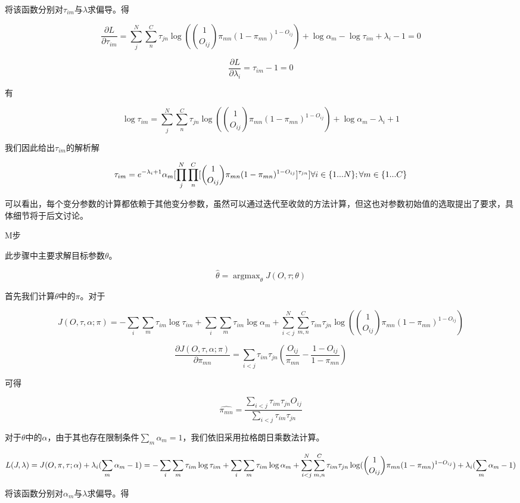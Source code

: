 \documentclass[
]{article}
\begin{document}
将该函数分别对\(\tau_{im}\)与\(\lambda\)求偏导。得

\[\frac{\partial L}{\partial \tau_{im}}=\sum_{j}^N\sum_{n}^C\tau_{jn}\log ( \binom{1}{O_{ij}}\pi_{mn}(1-\pi_{mn})^{1-O_{ij}})+\log \alpha_m -\log \tau_{im} +\lambda_i-1=0\]

\[\frac{\partial L}{\partial \lambda_i}=\tau_{im}-1=0\]

有

\[\log \tau_{im} =\sum_{j}^N\sum_{n}^C\tau_{jn}\log ( \binom{1}{O_{ij}}\pi_{mn}(1-\pi_{mn})^{1-O_{ij}})+\log \alpha_m -\lambda_i+1\]

我们因此给出\(\tau_{im}\)的解析解

\[\tau_{im} = e^{-\lambda_i+1}\alpha_m[\prod_j^N\prod_n^C[ \binom{1}{O_{ij}}\pi_{mn}(1-\pi_{mn})^{1-O_{ij}}]^{\tau_{jn}}]\\
\forall i \in \{1 ...N\} ;\forall m \in \{1 ... C\}\]

可以看出，每个变分参数的计算都依赖于其他变分参数，虽然可以通过迭代至收敛的方法计算，但这也对参数初始值的选取提出了要求，具体细节将于后文讨论。

M步

此步骤中主要求解目标参数\(\theta\)。

\[\hat{\theta}=\mathop{\arg\max}_\theta J(O,\tau;\theta)\]

首先我们计算\(\theta\)中的\(\pi\)。对于

\[J(O,\tau,\alpha;\pi)=-\sum_i\sum_m\tau_{im} \log \tau_{im} +\sum_i\sum_m \tau_{im} \log \alpha_m +\sum_{i<j}^N\sum_{m,n}^C\tau_{im}\tau_{jn}\log ( \binom{1}{O_{ij}}\pi_{mn}(1-\pi_{mn})^{1-O_{ij}})\]

\[\frac{\partial J(O,\tau,\alpha;\pi)}{\partial \pi_{mn}}=\sum_{i<j}\tau_{im}\tau_{jn}(\frac{O_{ij}}{\pi_{mn}}-\frac{1-O_{ij}}{1-\pi_{mn}})\]

可得

\[\hat{\pi_{mn}}=\frac{\sum_{i<j}\tau_{im}\tau_{jn}O_{ij}}{\sum_{i<j}\tau_{im}\tau_{jn}}\]

对于\(\theta\)中的\(\alpha\)，由于其也存在限制条件\(\sum_m \alpha_m=1\)，我们依旧采用拉格朗日乘数法计算。

\[L(J,\lambda)=J(O,\pi,\tau;\alpha)+\lambda_i(\sum_m \alpha_{m}-1)\\
=-\sum_i\sum_m\tau_{im} \log \tau_{im} +\sum_i\sum_m \tau_{im} \log \alpha_m +\sum_{i<j}^N\sum_{m,n}^C\tau_{im}\tau_{jn}\log ( \binom{1}{O_{ij}}\pi_{mn}(1-\pi_{mn})^{1-O_{ij}})+\lambda_i(\sum_m \alpha_{m}-1)\]

将该函数分别对\(\alpha_{m}\)与\(\lambda\)求偏导。得
\end{document}
